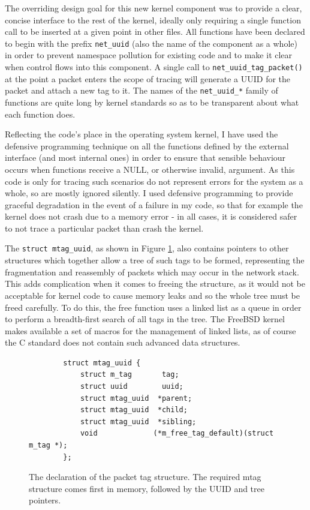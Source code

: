 \documentclass[a4paper,12pt,twoside,openright]{report}
\begin{document}
	The overriding design goal for this new kernel component was to provide a clear, concise interface to the rest of the kernel, ideally only requiring a single function call to be inserted at a given point in other files. All functions have been declared to begin with the prefix \verb|net_uuid| (also the name of the component as a whole) in order to prevent namespace pollution for existing code and to make it clear when control flows into this component. A single call to \verb|net_uuid_tag_packet()| at the point a packet enters the scope of tracing will generate a UUID for the packet and attach a new tag to it. The names of the \verb|net_uuid_*| family of functions are quite long by kernel standards so as to be transparent about what each function does.
	
	Reflecting the code's place in the operating system kernel, I have used the defensive programming technique on all the functions defined by the external interface (and most internal ones) in order to ensure that sensible behaviour occurs when functions receive a NULL, or otherwise invalid, argument. As this code is only for tracing such scenarios do not represent errors for the system as a whole, so are mostly ignored silently. I used defensive programming to provide graceful degradation in the event of a failure in my code, so that for example the kernel does not crash due to a memory error - in all cases, it is considered safer to not trace a particular packet than crash the kernel.
	
	The \verb|struct mtag_uuid|, as shown in Figure \ref{fig:mtag_uuid}, also contains pointers to other structures which together allow a tree of such tags to be formed, representing the fragmentation and reassembly of packets which may occur in the network stack. This adds complication when it comes to freeing the structure, as it would not be acceptable for kernel code to cause memory leaks and so the whole tree must be freed carefully. To do this, the free function uses a linked list as a queue in order to perform a breadth-first search of all tags in the tree. The FreeBSD kernel makes available a set of macros for the management of linked lists, as of course the C standard does not contain such advanced data structures.
	
	\begin{figure}
		\label{fig:mtag_uuid}
		\begin{verbatim}
		struct mtag_uuid {
		    struct m_tag       tag;
		    struct uuid        uuid;
		    struct mtag_uuid  *parent;
		    struct mtag_uuid  *child;
		    struct mtag_uuid  *sibling;
		    void             (*m_free_tag_default)(struct m_tag *);
		};
		\end{verbatim}
		\caption{The declaration of the packet tag structure. The required mtag structure comes first in memory, followed by the UUID and tree pointers.}
	\end{figure}
	
\end{document}
